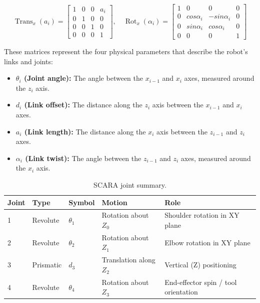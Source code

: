 \documentclass{article}
\begin{document}
\begin{equation*}
\operatorname{Trans}_x(a_i) = \begin{bmatrix} 1 & 0 & 0 & a_i \\ 0 & 1 & 0 & 0 \\ 0 & 0 & 1 & 0 \\ 0 & 0 & 0 & 1 \end{bmatrix}, \quad 
\operatorname{Rot}_x(\alpha_i) = \begin{bmatrix} 1 & 0 & 0 & 0 \\ 0 & cos\alpha_i & -sin\alpha_i & 0 \\ 0 & sin\alpha_i & cos\alpha_i & 0 \\ 0 & 0 & 0 & 1 \end{bmatrix}
\end{equation*}

These matrices represent the four physical parameters that describe the robot's links and joints:
\begin{itemize}
    \item \textbf{$\theta_i$ (Joint angle):} The angle between the $x_{i-1}$ and $x_i$ axes, measured around the $z_i$ axis.
    \item \textbf{$d_i$ (Link offset):} The distance along the $z_i$ axis between the $x_{i-1}$ and $x_i$ axes.
    \item \textbf{$a_i$ (Link length):} The distance along the $x_i$ axis between the $z_{i-1}$ and $z_i$ axes.
    \item \textbf{$\alpha_i$ (Link twist):} The angle between the $z_{i-1}$ and $z_i$ axes, measured around the $x_i$ axis.
\end{itemize}


\begin{table}[h!]
\centering
\begin{tabular}{lllll}
\toprule
Joint & Type & Symbol & Motion & Role \\
\midrule
1 & Revolute & $\theta_1$ & Rotation about $Z_0$ & Shoulder rotation in XY plane \\
2 & Revolute & $\theta_2$ & Rotation about $Z_1$ & Elbow rotation in XY plane \\
3 & Prismatic & $d_3$ & Translation along $Z_2$ & Vertical (Z) positioning \\
4 & Revolute & $\theta_4$ & Rotation about $Z_3$ & End-effector spin / tool orientation \\
\bottomrule
\end{tabular}
\caption{SCARA joint summary.}
\end{table}
\end{document}
